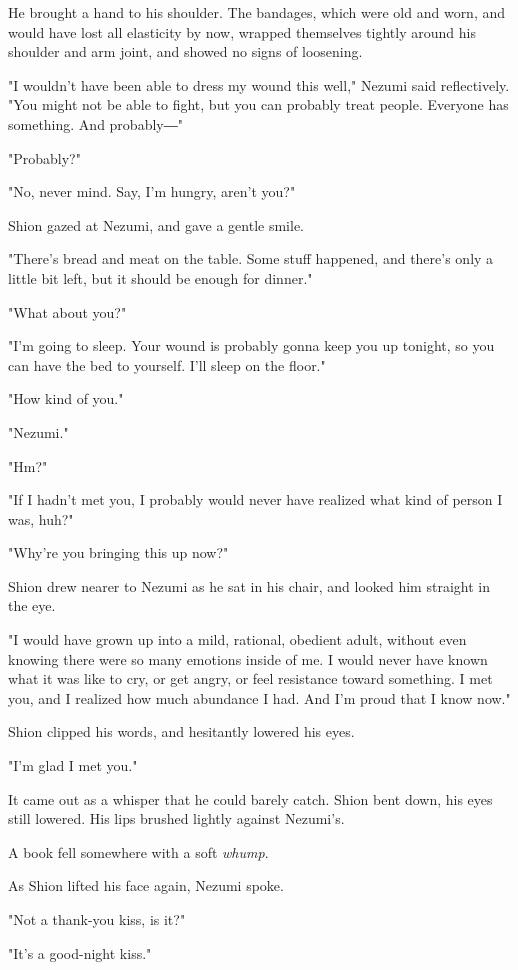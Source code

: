 He brought a hand to his shoulder. The bandages, which were old and
worn, and would have lost all elasticity by now, wrapped themselves
tightly around his shoulder and arm joint, and showed no signs of
loosening.

"I wouldn't have been able to dress my wound this well," Nezumi said
reflectively. "You might not be able to fight, but you can probably
treat people. Everyone has something. And probably―"

"Probably?"

"No, never mind. Say, I'm hungry, aren't you?"

Shion gazed at Nezumi, and gave a gentle smile.

"There's bread and meat on the table. Some stuff happened, and there's
only a little bit left, but it should be enough for dinner."

"What about you?"

"I'm going to sleep. Your wound is probably gonna keep you up tonight,
so you can have the bed to yourself. I'll sleep on the floor."

"How kind of you."

"Nezumi."

"Hm?"

"If I hadn't met you, I probably would never have realized what kind of
person I was, huh?"

"Why're you bringing this up now?"

Shion drew nearer to Nezumi as he sat in his chair, and looked him
straight in the eye.

"I would have grown up into a mild, rational, obedient adult, without
even knowing there were so many emotions inside of me. I would never
have known what it was like to cry, or get angry, or feel resistance
toward something. I met you, and I realized how much abundance I had.
And I'm proud that I know now."

Shion clipped his words, and hesitantly lowered his eyes.

"I'm glad I met you."

It came out as a whisper that he could barely catch. Shion bent down,
his eyes still lowered. His lips brushed lightly against Nezumi's.

A book fell somewhere with a soft \emph{whump}.

As Shion lifted his face again, Nezumi spoke.

"Not a thank-you kiss, is it?"

"It's a good-night kiss."


